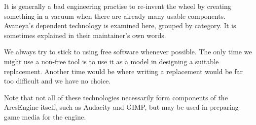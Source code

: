 

It is generally a bad engineering practise to re-invent the wheel by creating something in a vacuum when there are already many usable components. Avaneya's dependent technology is examined here, grouped by category. It is sometimes explained in their maintainer's own words.

We always try to stick to using free software whenever possible. The only time we might use a non-free tool is to use it as a model in designing a suitable replacement. Another time would be where writing a replacement would be far too difficult and we have no choice.

Note that not all of these technologies necessarily form components of the AresEngine itself, such as Audacity and GIMP, but may be used in preparing game media for the engine.


\page 
\page 
\page 
\page 
\page 
\page 
\page 
\page 
\page 
\page 

\StopChapter

